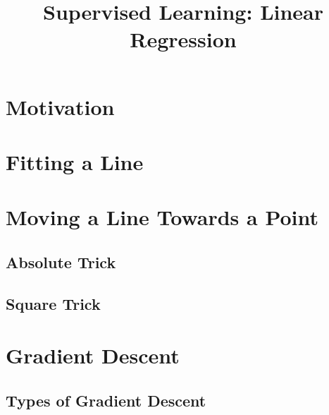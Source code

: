\documentclass{article}
\title{Supervised Learning: Linear Regression}
\begin{document}
\maketitle
\section{Motivation}
\section{Fitting a Line}
\section{Moving a Line Towards a Point}
\subsection{Absolute Trick}
\subsection{Square Trick}



\section{Gradient Descent}

\subsection{Types of Gradient Descent}
\end{document}
